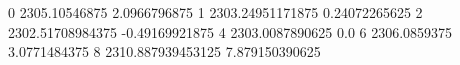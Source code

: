 0 2305.10546875 2.0966796875
1 2303.24951171875 0.24072265625
2 2302.51708984375 -0.49169921875
4 2303.0087890625 0.0
6 2306.0859375 3.0771484375
8 2310.887939453125 7.879150390625
